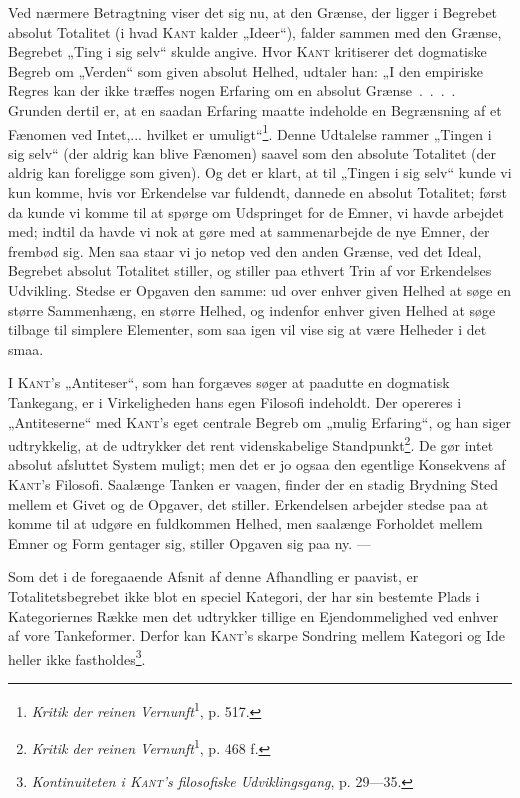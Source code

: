 \documentclass[12pt]{article}
\newcommand{\opage}[1]{\marginnote{\footnotesize\textit{[#1]}}}
\begin{document}
Ved nærmere Betragtning viser det sig nu, at den Grænse, der ligger i Begrebet
absolut Totalitet (i hvad \textsc{Kant} kalder „Ideer“), falder sammen med den
Grænse, Begrebet „Ting i sig selv“ skulde angive. Hvor \textsc{Kant} kritiserer
det dogmatiske Begreb om „Verden“ som given absolut Helhed, udtaler han: „I den
empiriske Regres kan der ikke træffes nogen Erfaring om en absolut
Grænse~.~.~.~. Grunden dertil er, at en saadan Erfaring maatte indeholde en
Begrænsning af et
\setcounter{footnote}{0}%
\opage{75}Fænomen ved Intet,... hvilket er umuligt“\footnote{\textit{Kritik der
reinen Vernunft}\textsuperscript{1}, p. 517.}. Denne Udtalelse rammer „Tingen i
sig selv“ (der aldrig kan blive Fænomen) saavel som den absolute Totalitet (der
aldrig kan foreligge som given). Og det er klart, at til „Tingen i sig selv“ kunde
vi kun komme, hvis vor Erkendelse var fuldendt, dannede en absolut Totalitet;
først da kunde vi komme til at spørge om Udspringet for de Emner, vi havde
arbejdet med; indtil da havde vi nok at gøre med at sammenarbejde de nye Emner,
der frembød sig. Men saa staar vi jo netop ved den anden Grænse, ved det Ideal,
Begrebet absolut Totalitet stiller, og stiller paa ethvert Trin af vor Erkendelses
Udvikling. Stedse er Opgaven den samme: ud over enhver given Helhed at søge
en større Sammenhæng, en større Helhed, og indenfor enhver given Helhed at søge
tilbage til simplere Elementer, som saa igen vil vise sig at være Helheder i
det smaa.

I \textsc{Kant}'s „Antiteser“, som han forgæves søger at paadutte en dogmatisk
Tankegang, er i Virkeligheden hans egen Filosofi indeholdt. Der opereres i
„Antiteserne“ med \textsc{Kant}'s eget centrale Begreb om „mulig Erfaring“, og
han siger udtrykkelig, at de udtrykker det rent videnskabelige
Standpunkt\footnote{\textit{Kritik der reinen Vernunft}\textsuperscript{1}, p.
468 f.}. De gør intet absolut afsluttet System muligt; men det er jo ogsaa den
egentlige Konsekvens af \textsc{Kant}'s Filosofi. Saalænge Tanken er vaagen,
finder der en stadig Brydning Sted mellem et Givet og de Opgaver, det stiller.
Erkendelsen arbejder stedse paa at komme til at udgøre en fuldkommen Helhed, men
saalænge Forholdet mellem Emner og Form gentager sig, stiller Opgaven sig paa
ny. ---

Som det i de foregaaende Afsnit af denne Afhandling er paavist, er
Totalitetsbegrebet ikke blot en speciel Kategori, der har sin bestemte Plads i
Kategoriernes Række men det udtrykker tillige en Ejendommelighed ved enhver af
vore Tankeformer. Derfor kan \textsc{Kant}'s skarpe Sondring mellem Kategori og
Ide heller ikke fastholdes\footnote{\textit{Kontinuiteten i \textsc{Kant}'s
filosofiske Udviklingsgang}, p. 29---35.}.
\end{document}
